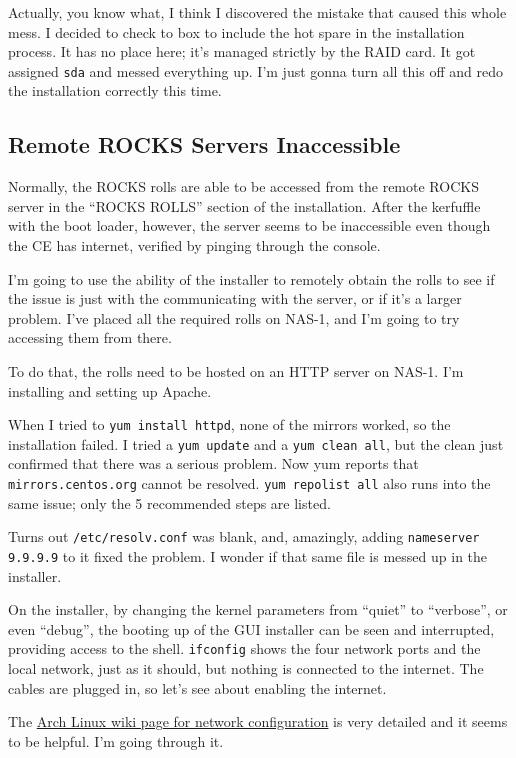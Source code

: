 \documentclass[12pt]{article}
\begin{document}
\qq Actually, you know what, I think I discovered the mistake that caused this
whole mess. I decided to check to box to include the hot spare in the
installation process. It has no place here; it's managed strictly by the RAID
card. It got assigned {\tt sda} and messed everything up. I'm just gonna turn all
this off and redo the installation correctly this time.

\subsection{Remote ROCKS Servers Inaccessible}

\qq Normally, the ROCKS rolls are able to be accessed from the remote ROCKS
server in the ``ROCKS ROLLS'' section of the installation. After the kerfuffle
with the boot loader, however, the server seems to be inaccessible even though
the CE has internet, verified by pinging through the console.

\qq I'm going to use the ability of the installer to remotely obtain the rolls
to see if the issue is just with the communicating with the server, or if it's a
larger problem. I've placed all the required rolls on NAS-1, and I'm going to
try accessing them from there.

\qq To do that, the rolls need to be hosted on an HTTP server on NAS-1. I'm
installing and setting up Apache.

\qq When I tried to {\tt yum install httpd}, none of the mirrors worked, so the
installation failed. I tried a {\tt yum update} and a {\tt yum clean all}, but the
clean just confirmed that there was a serious problem. Now yum reports that
{\tt mirrors.centos.org} cannot be resolved. {\tt yum repolist all} also runs into
the same issue; only the 5 recommended steps are listed. 

\qq Turns out {\tt /etc/resolv.conf} was blank, and, amazingly, adding
{\tt nameserver 9.9.9.9} to it fixed the problem. I wonder if that same file is
messed up in the installer.

\qq On the installer, by changing the kernel parameters from ``quiet'' to
``verbose'', or even ``debug'', the booting up of the GUI installer can be seen
and interrupted, providing access to the shell. {\tt ifconfig} shows the four
network ports and the local network, just as it should, but nothing is connected
to the internet. The cables are plugged in, so let's see about enabling the
internet.

\qq The \href{https://wiki.archlinux.org/index.php/Network_configuration}{Arch
  Linux wiki page for network configuration} is very detailed and it seems to be
helpful. I'm going through it.
\end{document}
